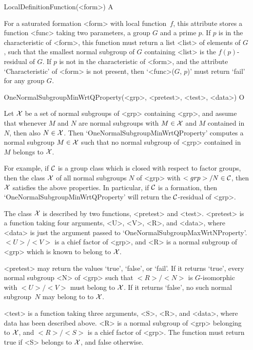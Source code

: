 \>LocalDefinitionFunction(<form>) A

For a saturated formation <form> with local function~$f$, this attribute
stores a function <func> taking two parameters, a group
$G$ and a prime $p$. If $p$ is in the characteristic of <form>, this
function must return a list <list> of elements of
$G$, such that the smallest normal subgroup of $G$ containing <list> is the
$f(p)$-residual of $G$. If $p$ is not in the characteristic of <form>, and the
attribute `Characteristic' of <form> is not present, then `<func>($G$, $p$)'
must return `fail' for any group $G$. 



\>OneNormalSubgroupMinWrtQProperty(<grp>, <pretest>, <test>, <data>) O

Let $\cal X$ be a set of normal subgroups of <grp> containing <grp>, and
assume that whenever
$M$ and $N$ are normal subgroups with $M \in \cal X$ and $M$
contained in $N$, then also $N \in \cal X$. Then
`OneNormalSubgroupMinWrtQProperty' computes a normal subgroup $M \in \cal X$
such that no normal subgroup of <grp> contained in $M$ belongs to $\cal X$. 

For example, if $\cal C$ is a group class which is closed with respect to
factor groups, then the class $\cal X$ of all normal subgroups $N$ of <grp>
with $<grp>/N \in \cal C$, then $\cal X$ satisfies the above properties. In
particular, if $\cal C$ is a formation, then
`OneNormalSubgroupMinWrtQProperty' will return the $\cal C$-residual of
<grp>.

The class $\cal X$ is described by two functions, <pretest> and <test>. 
<pretest> is a function taking four arguments, <U>, <V>, <R>, and <data>,
where <data> is just the argument passed to
`OneNormalSubgroupMaxWrtNProperty'. $<U>/<V>$ is a chief factor of <grp>,
and  <R> is a normal subgroup of <grp> which is known to belong to $\cal X$.

<pretest> may return the values `true', `false', or `fail'. If it returns 
`true', every normal subgroup <N> of <grp> such that $<R>/<N>$ is
$G$-isomorphic with $<U>/<V>$ must belong to $\cal X$. If it returns
`false', no such normal subgroup~$N$ may belong to to $\cal X$. 

<test> is a function taking three arguments, <S>, <R>, and <data>, where
data has been described above. <R> is a normal subgroup of <grp> belonging to
$\cal X$, and $<R>/<S>$ is a chief factor of <grp>. The function must return
true if <S> belongs to $\cal X$, and false otherwise. 

